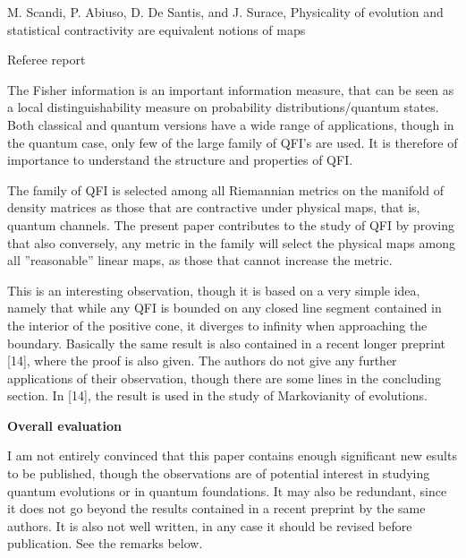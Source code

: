 \documentclass[12pt]{article}
\begin{document}
\begin{center}
{\large  M. Scandi, P. Abiuso, D. De Santis, and J. Surace, Physicality of evolution and statistical contractivity are equivalent notions of maps

}

\end{center}
\medskip

\centerline{Referee report}

\bigskip

The Fisher information is an important information measure, that can be seen as a local
distinguishability measure on probability distributions/quantum states. Both classical and
quantum versions have a wide range of applications, though in the quantum case, only few
of the large family  of QFI's are used. It is therefore of importance to understand the structure and
properties of QFI. 

The family of QFI is selected among all  Riemannian metrics on the manifold of
density matrices as those that are contractive under physical maps, that is, quantum
channels. The present paper contributes to the study of QFI by proving that also
conversely,  any metric in
the family will select the physical maps among all ''reasonable'' linear maps, as those
that cannot increase the metric. 

This is an interesting observation, though it is based on a very simple idea, namely that
while any QFI is bounded on any closed line segment contained in the interior of the
positive cone, it diverges to infinity when approaching the boundary. Basically the same  result is also
contained in a recent longer preprint [14], where the proof is also given. 
The authors do not give any further applications of their observation, though there are
some lines in the concluding section. In [14], the result is used in the study of
Markovianity of evolutions. 




\medskip

\noindent
\textbf{Overall evaluation}

I am not entirely convinced that this paper contains enough significant new esults to be published,
though the observations are of potential interest in studying quantum evolutions or in
quantum foundations. It may also be redundant, since it does not go beyond the results
contained in a recent preprint by the same authors. It is also not well written, in any
case it should be revised before publication. See the remarks below.
\end{document}
